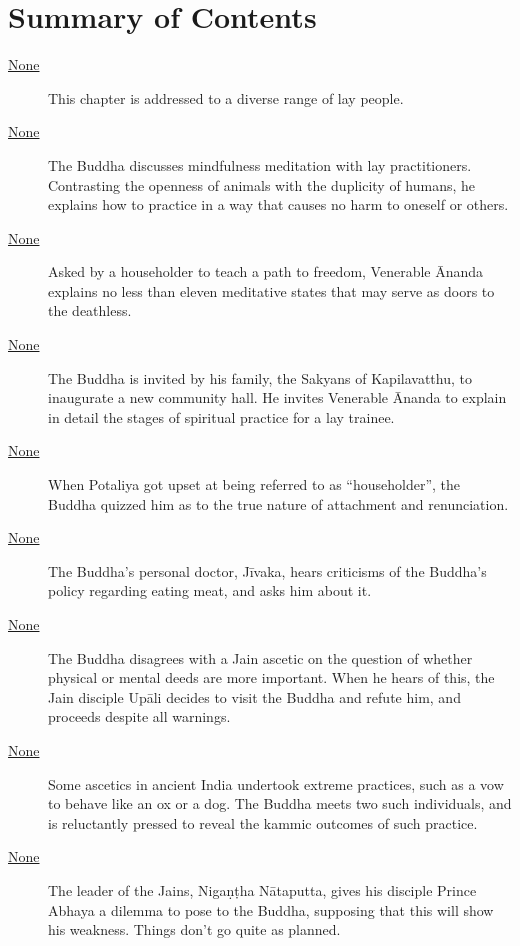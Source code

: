\documentclass[12pt,openany]{book}%
\begin{document}
\newpage

\setlength{\parindent}{1.5em}%
\tableofcontents
\newpage
\pagestyle{fancy}
%
\chapter*{Summary of Contents}

\begin{description}%
\item[\href{\#mn{-}gahapativagga}{None}] This chapter is addressed to a diverse range of lay people.%
\item[\href{\#mn51}{None}] The Buddha discusses mindfulness meditation with lay practitioners. Contrasting the openness of animals with the duplicity of humans, he explains how to practice in a way that causes no harm to oneself or others.%
\item[\href{\#mn52}{None}] Asked by a householder to teach a path to freedom, Venerable Ānanda explains no less than eleven meditative states that may serve as doors to the deathless.%
\item[\href{\#mn53}{None}] The Buddha is invited by his family, the Sakyans of Kapilavatthu, to inaugurate a new community hall. He invites Venerable Ānanda to explain in detail the stages of spiritual practice for a lay trainee.%
\item[\href{\#mn54}{None}] When Potaliya got upset at being referred to as “householder”, the Buddha quizzed him as to the true nature of attachment and renunciation.%
\item[\href{\#mn55}{None}] The Buddha’s personal doctor, \textsanskrit{Jīvaka}, hears criticisms of the Buddha’s policy regarding eating meat, and asks him about it.%
\item[\href{\#mn56}{None}] The Buddha disagrees with a Jain ascetic on the question of whether physical or mental deeds are more important. When he hears of this, the Jain disciple \textsanskrit{Upāli} decides to visit the Buddha and refute him, and proceeds despite all warnings.%
\item[\href{\#mn57}{None}] Some ascetics in ancient India undertook extreme practices, such as a vow to behave like an ox or a dog. The Buddha meets two such individuals, and is reluctantly pressed to reveal the kammic outcomes of such practice.%
\item[\href{\#mn58}{None}] The leader of the Jains, \textsanskrit{Nigaṇṭha} \textsanskrit{Nātaputta}, gives his disciple Prince Abhaya a dilemma to pose to the Buddha, supposing that this will show his weakness. Things don’t go quite as planned.%

\end{description}
\end{document}
